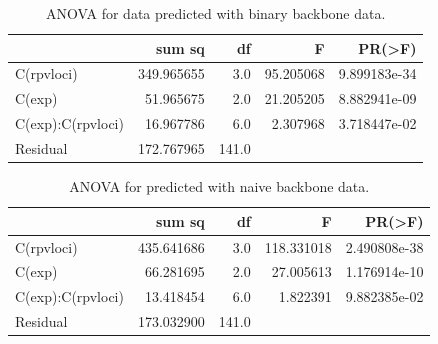 \documentclass[english]{article}
\begin{document}
\begin{table}[H]
    \centering
    \caption{ANOVA for data predicted with binary backbone data.}
    \label{tab:anovaanno}
    \begin{tabular}{lrrrr}
        \toprule
        {}                & sum sq     & df    & F         & PR(>F)       \\
        \midrule
        C(rpvloci)        & 349.965655 & 3.0   & 95.205068 & 9.899183e-34 \\
        C(exp)            & 51.965675  & 2.0   & 21.205205 & 8.882941e-09 \\
        C(exp):C(rpvloci) & 16.967786  & 6.0   & 2.307968  & 3.718447e-02 \\
        Residual          & 172.767965 & 141.0 &           &              \\
        \bottomrule
    \end{tabular}
\end{table}

\begin{table}[H]
    \centering
    \caption{ANOVA for predicted with naive backbone data.}
    \label{tab:anovaanno}
    \begin{tabular}{lrrrr}
        \toprule
        {}                & sum sq     & df    & F          & PR(>F)       \\
        \midrule
        C(rpvloci)        & 435.641686 & 3.0   & 118.331018 & 2.490808e-38 \\
        C(exp)            & 66.281695  & 2.0   & 27.005613  & 1.176914e-10 \\
        C(exp):C(rpvloci) & 13.418454  & 6.0   & 1.822391   & 9.882385e-02 \\
        Residual          & 173.032900 & 141.0 &            &              \\
        \bottomrule
    \end{tabular}
\end{table}
\end{document}
